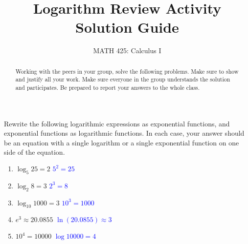 \documentclass{ximera}
\title{Logarithm Review Activity Solution Guide}
\author{MATH 425: Calculus I}
\begin{document}
\begin{abstract}
   Working with the peers in your group, solve the following problems. Make sure to show and justify all your work. Make sure everyone in the group understands the solution and participates. Be prepared to report your answers to the whole class. 
\end{abstract}
\maketitle

\begin{exercise}
    Rewrite the following logarithmic expressions as exponential functions, and exponential functions as logarithmic functions.  In each case, your answer should be an equation with a single logarithm or a single exponential function on one side of the equation.
    \begin{enumerate}
        \item $\log_5 25=2$ \textcolor{blue}{$5^2=25$}
        \item $\log_2 8=3$ \textcolor{blue}{$2^3=8$}
        \item $\log_{10} 1000=3$ \textcolor{blue}{$10^3=1000$}
        \item $e^3\approx 20.0855$ \textcolor{blue}{$\ln(20.0855)\approx 3$}
        \item $10^4=10000$ \textcolor{blue}{$\log 10000=4$}
    \end{enumerate}
\end{exercise}
\end{document}
